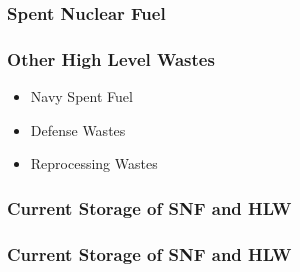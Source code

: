 
\begin{frame}[c]
  \frametitle{Spent Nuclear Fuel}
  
\end{frame}

\begin{frame}[c]
  \frametitle{Other High Level Wastes}
  \begin{itemize}
    \item Navy Spent Fuel
    \item Defense Wastes
    \item Reprocessing Wastes
  \end{itemize}
\end{frame}

\begin{frame}[c]
  \frametitle{Current Storage of SNF and HLW}
  
\end{frame}

\begin{frame}[c]
  \frametitle{Current Storage of SNF and HLW}
  
\end{frame}

